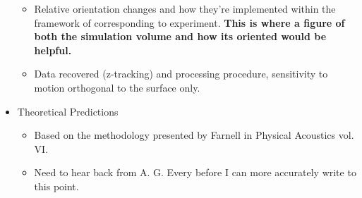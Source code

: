 \begin{itemize}
\begin{itemize}
	\item Relative orientation changes and how they're implemented within the framework of corresponding to experiment. \textbf{This is where a figure of both the simulation volume and how its oriented would be helpful.}
	\item Data recovered (z-tracking) and processing procedure, sensitivity to motion orthogonal to the surface only. 
	\end{itemize}
\item Theoretical Predictions
	\begin{itemize}
	\item Based on the methodology presented by Farnell in Physical Acoustics vol. VI. 
	\item Need to hear back from A. G. Every before I can more accurately write to this point.
	\end{itemize}
\end{itemize}

